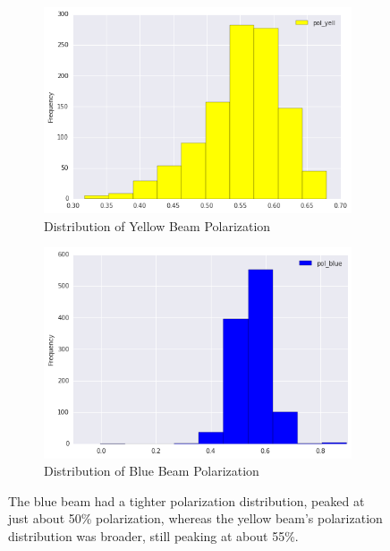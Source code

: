\begin{figure}[H]
	\centering
	\begin{subfigure}[t]{0.5\textwidth}
		\centering
		\includegraphics[width=0.95\linewidth]{./figures/yell_polarization.png}
		\caption{Distribution of Yellow Beam Polarization}
		\label{fig:pol_yell}
	\end{subfigure}%
  \begin{subfigure}[t]{0.5\textwidth}
		\centering
		\includegraphics[width=0.95\linewidth]{./figures/blue_polarization.png}
    \caption{Distribution of Blue Beam Polarization}
		\label{fig:pol_blue}
	\end{subfigure}
	\caption{ 
    The blue beam had a tighter polarization distribution, peaked at just about
    50\% polarization, whereas the yellow beam's polarization distribution was
    broader, still peaking at about 55\%.
  }
	\label{fig:pol_distribution}
\end{figure}

